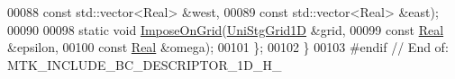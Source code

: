 \begin{DoxyCode}
00088                                       \textcolor{keyword}{const} std::vector<Real> &west,
00089                                       \textcolor{keyword}{const} std::vector<Real> &east);
00090 
00098   \textcolor{keyword}{static} \textcolor{keywordtype}{void} \hyperlink{classmtk_1_1BCDescriptor1D_adfb101c1a12b452f83dacd207febea0a}{ImposeOnGrid}(\hyperlink{classmtk_1_1UniStgGrid1D}{UniStgGrid1D} &grid,
00099                            \textcolor{keyword}{const} \hyperlink{group__c01-roots_gac080bbbf5cbb5502c9f00405f894857d}{Real} &epsilon,
00100                            \textcolor{keyword}{const} \hyperlink{group__c01-roots_gac080bbbf5cbb5502c9f00405f894857d}{Real} &omega);
00101 \};
00102 \}
00103 \textcolor{preprocessor}{#endif  // End of: MTK\_INCLUDE\_BC\_DESCRIPTOR\_1D\_H\_}
\end{DoxyCode}
